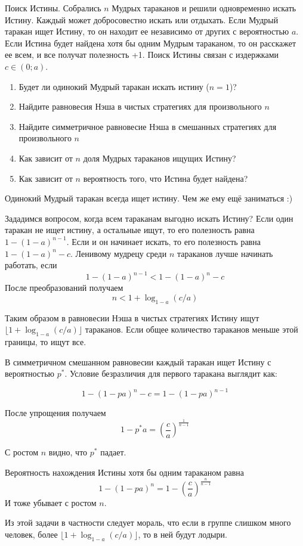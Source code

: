 \begin{problem}
Поиск Истины.
Собрались $n$ Мудрых тараканов и решили одновременно искать Истину. Каждый может добросовестно искать или отдыхать. Если Мудрый таракан ищет Истину, то он находит ее независимо от других с вероятностью $a$. Если Истина будет найдена хотя бы одним Мудрым тараканом, то он расскажет ее всем, и все получат полезность +1. Поиск Истины связан с издержками $c\in(0;a)$.
\begin{enumerate}
\item Будет ли одинокий Мудрый таракан искать истину ($n=1$)?
\item Найдите равновесия Нэша в чистых стратегиях для произвольного $n$
\item Найдите симметричное равновесие Нэша в смешанных стратегиях для произвольного $n$
\item Как зависит от $n$ доля Мудрых тараканов ищущих Истину?
\item Как зависит от $n$ вероятность того, что Истина будет найдена?
\end{enumerate}


\begin{sol}
Одинокий Мудрый таракан всегда ищет истину. Чем же ему ещё заниматься :)

Зададимся вопросом, когда всем тараканам выгодно искать Истину?
Если один таракан не ищет истину, а остальные ищут, то его полезность равна $1-(1-a)^{n-1}$. Если и он начинает искать, то его полезность равна $1-(1-a)^n-c$. Ленивому мудрецу среди $n$ тараканов лучше начинать работать, если
\[
1-(1-a)^{n-1} < 1-(1-a)^n-c
\]
После преобразований получаем
\[
n< 1 + \log_{1-a}(c/a)
\]

Таким образом в равновесии Нэша в чистых стратегиях Истину ищут $\lfloor 1 + \log_{1-a}(c/a) \rfloor$ тараканов. Если общее количество тараканов меньше этой границы, то ищут все.

В симметричном смешанном равновесии каждый таракан ищет Истину с вероятностью $p^*$.  Условие безразличия для первого таракана выглядит как:

\[
1-(1-pa)^n-c=1-(1-pa)^{n-1}
\]

После упрощения получаем
\[
1-p^{*}a=\left(\frac{c}{a}\right)^{\frac{1}{n-1}}
\]

С ростом $n$ видно, что $p^*$ падает.

Вероятность нахождения Истины хотя бы одним тараканом равна
\[
1-(1-pa)^n=1-\left(\frac{c}{a}\right)^{\frac{n}{n-1}}
\]
И тоже убывает с ростом $n$.

Из этой задачи в частности следует мораль, что если в группе слишком много человек, более $\lfloor 1 + \log_{1-a}(c/a) \rfloor$, то в ней будут лодыри.

\end{sol}
\end{problem}

